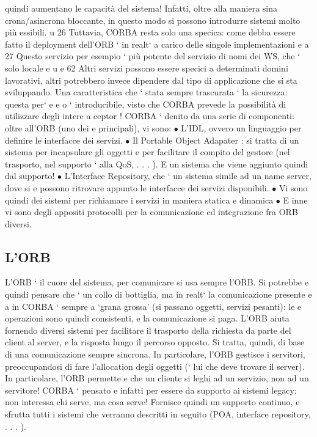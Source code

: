 \documentclass[a4paper,12pt]{article}
\begin{document}
quindi aumentano le capacità del sistema! Infatti, oltre alla maniera sina
crona/asincrona bloccante, in questo modo si possono introdurre sistemi
molto più essibili.
u
26 Tuttavia, CORBA resta solo una specica: come debba essere fatto il deployment
dell'ORB ` in realt` a carico delle singole implementazioni
e
a
27 Questo servizio per esempio ` più potente del servizio di nomi dei WS, che ` solo locale
e u
e
62
Altri servizi possono essere specici a determinati domini lavorativi, altri potrebbero invece dipendere dal tipo di
applicazione che si sta sviluppando.
Una caratteristica che ` stata sempre trascurata ` la sicurezza: questa per`
e
e
o
` introducibile, visto che CORBA prevede la possibilità di utilizzare degli intere
a
ceptor !
CORBA ` denito da una serie di componenti: oltre all'ORB (uno dei
e
principali), vi sono:
$\bullet$ L'IDL, ovvero un linguaggio per definire le interfacce dei servizi.
$\bullet$ Il Portable Object Adapater : si tratta di un sistema per incapsulare gli
oggetti e per facilitare il compito del gestore (nel trasporto, nel supporto
`
alla QoS, . . . ). E un sistema che viene aggiunto quindi dal supporto!
$\bullet$ L'Interface Repository, che ` un sistema simile ad un name server, dove si
e
possono ritrovare appunto le interfacce dei servizi disponibili.
$\bullet$ Vi sono quindi dei sistemi per richiamare i servizi in maniera statica e
dinamica
$\bullet$ E inne vi sono degli appositi protocolli per la comunicazione ed integrazione fra ORB diversi.
\subsection{L'ORB}
L'ORB ` il cuore del sistema, per comunicare si usa sempre l'ORB. Si potrebbe
e
quindi pensare che ` un collo di bottiglia, ma in realt` la comunicazione presente
e
a
in CORBA ` sempre a {`}grana grossa' (si passano oggetti, servizi pesanti): le
e
operazioni sono quindi consistenti, e la comunicazione si paga. L'ORB aiuta
fornendo diversi sistemi per facilitare il trasporto della richiesta da parte del
client al server, e la risposta lungo il percorso opposto. Si tratta, quindi, di base
di una comunicazione sempre sincrona.
In particolare, l'ORB gestisce i servitori, preoccupandosi di fare l'allocation
degli oggetti (` lui che deve trovare il server). In particolare, l'ORB permette
e
che un cliente si leghi ad un servizio, non ad un servitore! CORBA ` pensato
e
infatti per essere da supporto ai sistemi legacy: non interessa chi serve, ma
cosa serve! Fornisce quindi un supporto continuo, e sfrutta tutti i sistemi che
verranno descritti in seguito (POA, interface repository, . . . ).
\end{document}
